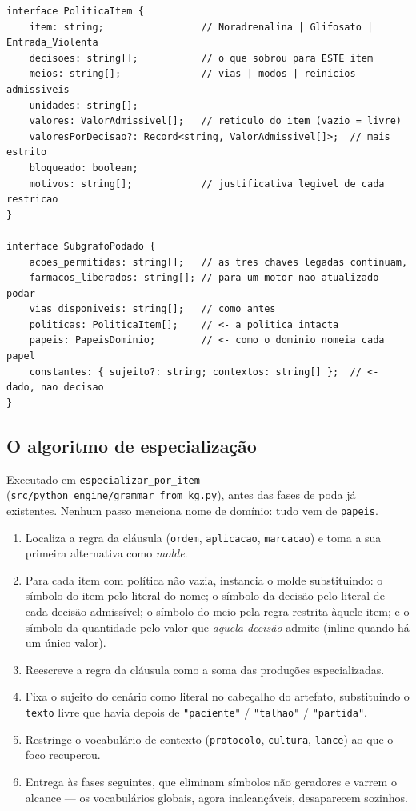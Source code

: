 \documentclass[11pt,a4paper]{article}
\begin{document}
\begin{lstlisting}[language=tsx,caption={Estrutura da política transportada (\texttt{src/knowledge/politica.ts}).}]
interface PoliticaItem {
    item: string;                 // Noradrenalina | Glifosato | Entrada_Violenta
    decisoes: string[];           // o que sobrou para ESTE item
    meios: string[];              // vias | modos | reinicios admissiveis
    unidades: string[];
    valores: ValorAdmissivel[];   // reticulo do item (vazio = livre)
    valoresPorDecisao?: Record<string, ValorAdmissivel[]>;  // mais estrito
    bloqueado: boolean;
    motivos: string[];            // justificativa legivel de cada restricao
}

interface SubgrafoPodado {
    acoes_permitidas: string[];   // as tres chaves legadas continuam,
    farmacos_liberados: string[]; // para um motor nao atualizado podar
    vias_disponiveis: string[];   // como antes
    politicas: PoliticaItem[];    // <- a politica intacta
    papeis: PapeisDominio;        // <- como o dominio nomeia cada papel
    constantes: { sujeito?: string; contextos: string[] };  // <- dado, nao decisao
}
\end{lstlisting}

\subsection{O algoritmo de especialização}

Executado em \texttt{especializar\_por\_item}
(\texttt{src/python\_engine/grammar\_from\_kg.py}), antes das fases de poda já
existentes. Nenhum passo menciona nome de domínio: tudo vem de
\texttt{papeis}.

\begin{enumerate}[leftmargin=*,itemsep=2pt]
\item Localiza a regra da cláusula (\texttt{ordem}, \texttt{aplicacao},
\texttt{marcacao}) e toma a sua primeira alternativa como \emph{molde}.
\item Para cada item com política não vazia, instancia o molde substituindo:
o símbolo do item pelo literal do nome; o símbolo da decisão pelo literal de
cada decisão admissível; o símbolo do meio pela regra restrita àquele item; e o
símbolo da quantidade pelo valor que \emph{aquela decisão} admite (inline quando
há um único valor).
\item Reescreve a regra da cláusula como a soma das produções especializadas.
\item Fixa o sujeito do cenário como literal no cabeçalho do artefato,
substituindo o \texttt{texto} livre que havia depois de
\texttt{"paciente"} / \texttt{"talhao"} / \texttt{"partida"}.
\item Restringe o vocabulário de contexto (\texttt{protocolo}, \texttt{cultura},
\texttt{lance}) ao que o foco recuperou.
\item Entrega às fases seguintes, que eliminam símbolos não geradores e varrem o
alcance --- os vocabulários globais, agora inalcançáveis, desaparecem sozinhos.
\end{enumerate}
\end{document}
